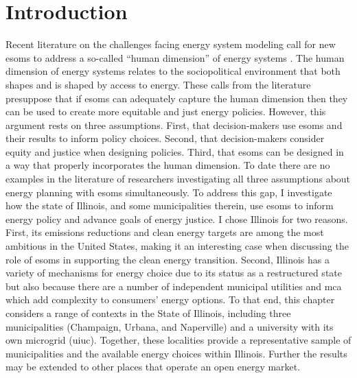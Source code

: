 \section{Introduction}

Recent literature on the challenges facing energy system modeling call for new
\acp{esom} to address a so-called ``human dimension'' of energy systems
\cite{pfenninger_energy_2014}. The human dimension of energy systems relates to
the sociopolitical environment that both shapes and is shaped by access to
energy. These calls from the literature presuppose that if \acp{esom} can
adequately capture the human dimension then they can be used to create more
equitable and just energy policies. However, this argument rests on three
assumptions. First, that decision-makers use \acp{esom} and their results to
inform policy choices. Second, that decision-makers consider equity and justice
when designing policies. Third, that \acp{esom} can be designed in a way that
properly incorporates the human dimension. To date there are no examples in the
literature of researchers investigating all three assumptions about energy
planning with \acp{esom} simultaneously. To address this gap, I investigate how
the state of Illinois, and some municipalities therein, use \acp{esom} to inform
energy policy and advance goals of energy justice. I chose Illinois for two
reasons. First, its emissions reductions and clean energy targets are among the
most ambitious in the United States, making it an interesting case when
discussing the role of \acp{esom} in supporting the clean energy transition.
Second, Illinois has a variety of mechanisms for energy choice due to its status
as a restructured state but also because there are a number of independent
municipal utilities and \ac{mca} which add complexity to consumers' energy
options. To that end, this chapter considers a range of contexts in the State of
Illinois, including three municipalities (Champaign, Urbana, and Naperville) and
a university with its own microgrid (\acf{uiuc}). Together, these localities
provide a representative sample of municipalities and the available energy
choices within Illinois. Further the results may be extended to other places
that operate an open energy market. 


